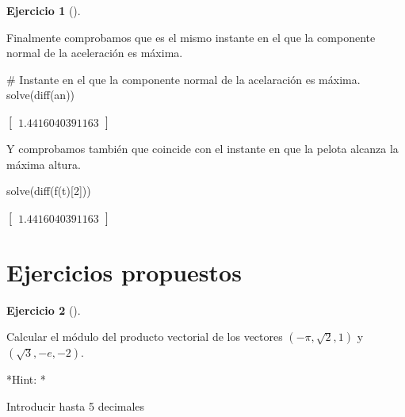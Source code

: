\documentclass[
  a4paper,
]{scrreport}
\newenvironment{Shaded}{\begin{snugshade}}{\end{snugshade}}
\newcommand{\CommentTok}[1]{\textcolor[rgb]{0.37,0.37,0.37}{#1}}
\newcommand{\FloatTok}[1]{\textcolor[rgb]{0.68,0.00,0.00}{#1}}
\newcommand{\FunctionTok}[1]{\textcolor[rgb]{0.28,0.35,0.67}{#1}}
\newcommand{\NormalTok}[1]{\textcolor[rgb]{0.00,0.23,0.31}{#1}}
\theoremstyle{definition}
\newtheorem{exercise}{Ejercicio}[chapter]
\theoremstyle{remark}
\begin{document}
\begin{exercise}[]
\begin{enumerate}
\begin{tcolorbox}
  Finalmente comprobamos que es el mismo instante en el que la
  componente normal de la aceleración es máxima.

\begin{Shaded}
\begin{Highlighting}[]
\CommentTok{\# Instante en el que la componente normal de la acelaración es máxima.}
\FunctionTok{solve}\NormalTok{(}\FunctionTok{diff}\NormalTok{(an))}
\end{Highlighting}
\end{Shaded}

  $\left[ \begin{array}{r}1.4416040391163\end{array} \right]$

  Y comprobamos también que coincide con el instante en que la pelota
  alcanza la máxima altura.

\begin{Shaded}
\begin{Highlighting}[]
\FunctionTok{solve}\NormalTok{(}\FunctionTok{diff}\NormalTok{(}\FunctionTok{f}\NormalTok{(t)[}\FloatTok{2}\NormalTok{]))}
\end{Highlighting}
\end{Shaded}

  $\left[ \begin{array}{r}1.4416040391163\end{array} \right]$

  \end{tcolorbox}
\end{enumerate}

\end{exercise}

\hypertarget{ejercicios-propuestos-6}{%
\section{Ejercicios propuestos}\label{ejercicios-propuestos-6}}

\begin{exercise}[]\protect\hypertarget{exr-funciones-vectoriales-propuesto-1}{}\label{exr-funciones-vectoriales-propuesto-1}

Calcular el módulo del producto vectorial de los vectores
\((-\pi,\sqrt{2},1)\) y \((\sqrt{3},-e,-2)\).

\vspace{18pt}*Hint: *

Introducir hasta 5 decimales

\end{exercise}
\end{document}
